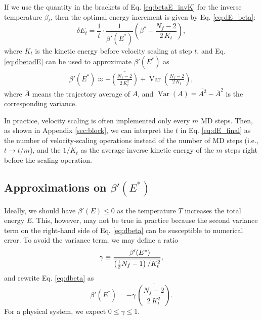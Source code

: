 \documentclass[reprint]{revtex4-1}
\begin{document}
If we use the quantity in the brackets of
Eq. \eqref{eq:betaE_invK} for the inverse temperature
$\beta_t$,
then the optimal energy increment is given by
Eq. \eqref{eq:dE_beta}:
%
\begin{equation}
\delta E_t
=
\frac{ 1 } { t } \cdot
\frac{ 1 } { \beta'(E^*) }
\left(
 \beta^* -
 \frac{ N_f - 2  }
      { 2 \, K_t }
\right)
,
\label{eq:dE_final}
\end{equation}
%
where
$K_t$ is the kinetic energy before velocity scaling at step $t$,
and
Eq. \eqref{eq:dbetadE} can be used to approximate
$\beta'(E^*)$ as
%
\begin{align}
  \beta'(E^*)
  \approx
  - \overline{
    \left(
      \frac{ N_f - 2 }
           { 2 \, K_t^2 }
    \right)
    }
    +
    \operatorname{Var}
    \left(
        \frac{ N_f - 2 }
             { 2 \, K_t }
    \right)
  ,
  \label{eq:dbeta}
\end{align}
%
where
$\overline A$ means the trajectory average of $A$,
and
$\operatorname{Var}(A) = \overline{ A^2 } - {\overline A}^2$
is the corresponding variance.

In practice, velocity scaling is often implemented
only every $m$ MD steps.
%
Then,
as shown in Appendix \ref{sec:block},
we can interpret the $t$ in Eq. \eqref{eq:dE_final} as
the number of velocity-scaling operations instead of
the number of MD steps (i.e., $t \to t/m$), and
the $1/K_t$ as the average inverse kinetic energy
of the $m$ steps right
before the scaling operation.




\subsection{Approximations on $\beta'(E^*)$}


Ideally, we should have $\beta'(E) \le 0$
as the temperature $T$ increases the total energy $E$.
%
This, however, may not be true in practice
because the second variance term on the right-hand side
of Eq. \eqref{eq:dbeta}
can be susceptible to numerical error.
%
%
To avoid the variance term,
we may define a ratio
%
\begin{equation}
  \gamma
  \equiv
  \frac
  {
    -\beta'(E^*)
  }
  {
    \overline{
      \left( \frac 1 2 N_f - 1  \right) / K_t^2
    }
  }
  ,
  \notag
\end{equation}
%
and rewrite Eq. \eqref{eq:dbeta} as
%
\begin{equation}
  \beta'(E^*)
  =
  -\gamma \, \overline{
    \left(
      \frac{ N_f - 2 }
           { 2 \, K_t^2 }
    \right)
    }
  .
  \label{eq:dbeta_approx}
\end{equation}
%
For a physical system, we expect $0 \le \gamma \le 1$.
%
\end{document}
